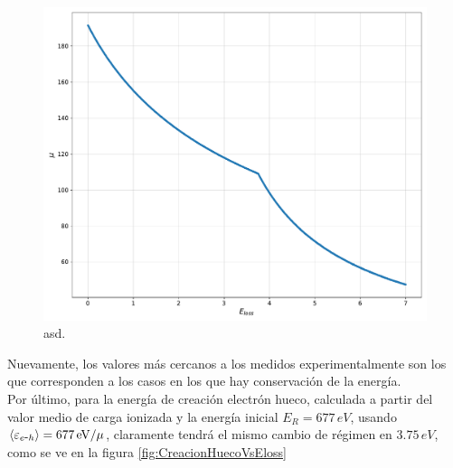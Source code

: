 \begin{figure}[h]
    \centering
    \includegraphics[scale=0.35]{Figs/ELoss_vs_mu_5ktrials_0-7Eloss.pdf}
    \caption{\footnotesize{asd.}}
    \label{fig:ElossVsMu}
\end{figure}
Nuevamente, los valores más cercanos a los medidos experimentalmente son los que corresponden a los casos en los que hay conservación de la energía.\\
\indent Por último, para la energía de creación electrón hueco, calculada a partir del valor medio de carga ionizada y la energía inicial $E_{R} = 677\,\si{eV}$, usando $\left\langle\varepsilon_{\eh} \right\rangle= 677\,\si{eV}/\mu$, claramente tendrá el mismo cambio de régimen en $3.75\,\si{eV}$, como se ve en la figura \ref{fig:CreacionHuecoVsEloss}
